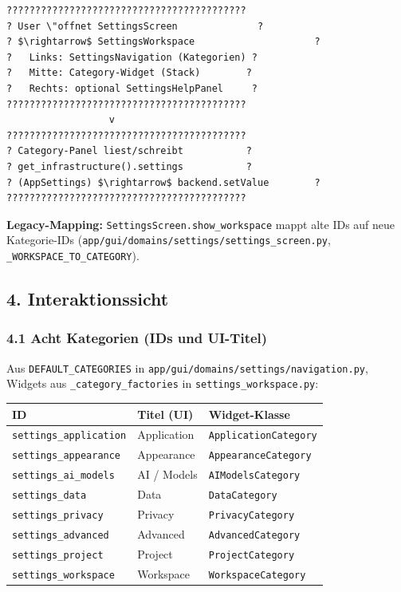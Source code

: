 \begin{verbatim}
??????????????????????????????????????????
? User \"offnet SettingsScreen              ?
? $\rightarrow$ SettingsWorkspace                     ?
?   Links: SettingsNavigation (Kategorien) ?
?   Mitte: Category-Widget (Stack)        ?
?   Rechts: optional SettingsHelpPanel     ?
??????????????????????????????????????????
                  v
??????????????????????????????????????????
? Category-Panel liest/schreibt           ?
? get_infrastructure().settings           ?
? (AppSettings) $\rightarrow$ backend.setValue        ?
??????????????????????????????????????????
\end{verbatim}

\textbf{Legacy-Mapping:} \texttt{SettingsScreen.show\_workspace} mappt alte IDs auf neue Kategorie-IDs (\texttt{app/gui/domains/settings/settings\_screen.py}, \texttt{\_WORKSPACE\_TO\_CATEGORY}).

\subsection{4. Interaktionssicht}

\subsubsection{4.1 Acht Kategorien (IDs und UI-Titel)}

Aus \texttt{DEFAULT\_CATEGORIES} in \texttt{app/gui/domains/settings/navigation.py}, Widgets aus \texttt{\_category\_factories} in \texttt{settings\_workspace.py}:

\begin{center}
\begin{tabular}{lll}
\hline
ID & Titel (UI) & Widget-Klasse \\
\hline
\texttt{settings\_application} & Application & \texttt{ApplicationCategory} \\
\texttt{settings\_appearance} & Appearance & \texttt{AppearanceCategory} \\
\texttt{settings\_ai\_models} & AI / Models & \texttt{AIModelsCategory} \\
\texttt{settings\_data} & Data & \texttt{DataCategory} \\
\texttt{settings\_privacy} & Privacy & \texttt{PrivacyCategory} \\
\texttt{settings\_advanced} & Advanced & \texttt{AdvancedCategory} \\
\texttt{settings\_project} & Project & \texttt{ProjectCategory} \\
\texttt{settings\_workspace} & Workspace & \texttt{WorkspaceCategory} \\
\hline
\end{tabular}
\end{center}

